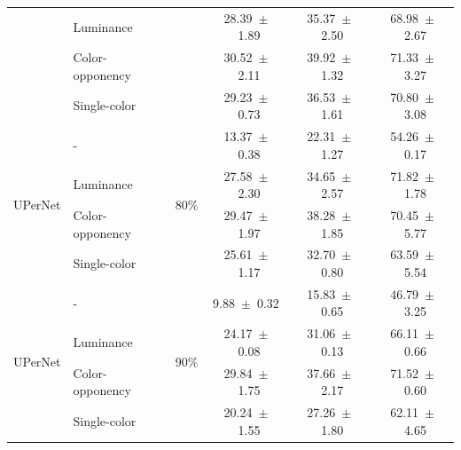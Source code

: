 \begin{table}[h]
\begin{tabular}{@{}l l c c c c@{}}
    & Luminance &  & 28.39~$\pm$~1.89 & 35.37~$\pm$~2.50 & 68.98~$\pm$~2.67 \\
    & Color-opponency &  & 30.52~$\pm$~2.11 & 39.92~$\pm$~1.32 & 71.33~$\pm$~3.27 \\
    & Single-color &  & 29.23~$\pm$~0.73 & 36.53~$\pm$~1.61 & 70.80~$\pm$~3.08 \\
    \midrule
    \multirow{4}{*}{UPerNet} & - & \multirow{4}{*}{80\%} & 13.37~$\pm$~0.38 & 22.31~$\pm$~1.27 & 54.26~$\pm$~0.17 \\
    & Luminance &  & 27.58~$\pm$~2.30 & 34.65~$\pm$~2.57 & 71.82~$\pm$~1.78 \\
    & Color-opponency &  & 29.47~$\pm$~1.97 & 38.28~$\pm$~1.85 & 70.45~$\pm$~5.77 \\
    & Single-color &  & 25.61~$\pm$~1.17 & 32.70~$\pm$~0.80 & 63.59~$\pm$~5.54 \\
    \midrule
    \multirow{4}{*}{UPerNet} & - & \multirow{4}{*}{90\%} & 9.88~$\pm$~0.32 & 15.83~$\pm$~0.65 & 46.79~$\pm$~3.25 \\
    & Luminance &  & 24.17~$\pm$~0.08 & 31.06~$\pm$~0.13 & 66.11~$\pm$~0.66 \\
    & Color-opponency &  & 29.84~$\pm$~1.75 & 37.66~$\pm$~2.17 & 71.52~$\pm$~0.60 \\
    & Single-color &  & 20.24~$\pm$~1.55 & 27.26~$\pm$~1.80 & 62.11~$\pm$~4.65 \\
    \midrule
    \bottomrule
  \end{tabular}
  \label{tab:upernet_acdc_full}
\end{table}